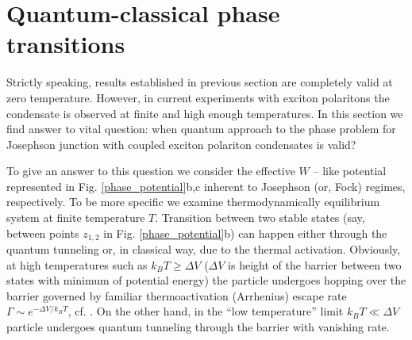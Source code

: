 \documentclass[aps, pre, preprint, groupedaddress, superscriptaddress, showkeys, showpacs] {revtex4-1}
\begin{document}


\section{Quantum-classical phase transitions \label{sec:quantum_classical}}

Strictly speaking, results established in previous section are completely valid at zero temperature. However, in current experiments with exciton polaritons  the condensate is observed at finite and high enough temperatures.
In this section we find answer to vital question: when quantum approach to the phase problem for Josephson junction with coupled exciton polariton condensates is valid?

To give an answer to this question we consider the effective $W$ -- like potential represented in Fig. \ref{phase_potential}b,c inherent to  Josephson (or, Fock) regimes, respectively.
To be more specific we examine thermodynamically equilibrium system at finite temperature $T$.  Transition between two stable states (say, between points $z_{1,2}$ in Fig. \ref{phase_potential}b) can happen  either through the quantum tunneling or, in classical way, due to the thermal activation. 
Obviously, at high temperatures such as $k_{B}T\ge\Delta V$ ($\Delta V$ is height of the barrier between two states with minimum of potential energy) the particle undergoes hopping over the barrier governed by familiar thermoactivation (Arrhenius) escape rate $\Gamma \sim e^{-\Delta V /k_{B}T}$, cf. \cite{Larkin}.
On the other hand, in the ``low temperature'' limit $k_{B}T\ll\Delta V$ particle undergoes quantum tunneling through the barrier with vanishing rate.
\end{document}
